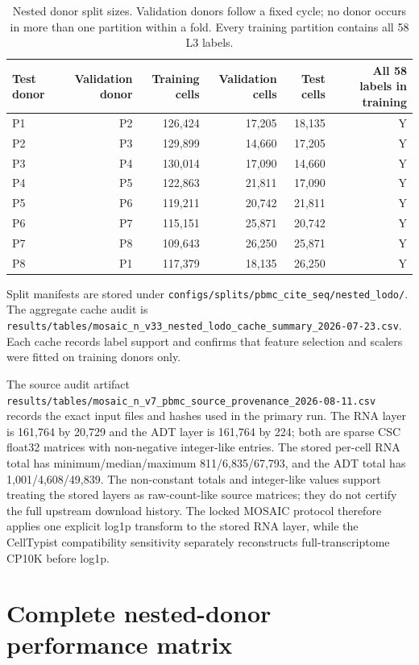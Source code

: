 \documentclass[10pt]{article}
\begin{document}
\begin{table}[H]
\centering
\caption{Nested donor split sizes. Validation donors follow a fixed cycle; no donor occurs in more than one partition within a fold. Every training partition contains all 58 L3 labels.}
\label{tab:splits}
\small
\begin{tabular}{lrrrrr}
\toprule
Test donor & Validation donor & Training cells & Validation cells & Test cells & All 58 labels in training \\
\midrule
P1 & P2 & 126,424 & 17,205 & 18,135 & Y \\
P2 & P3 & 129,899 & 14,660 & 17,205 & Y \\
P3 & P4 & 130,014 & 17,090 & 14,660 & Y \\
P4 & P5 & 122,863 & 21,811 & 17,090 & Y \\
P5 & P6 & 119,211 & 20,742 & 21,811 & Y \\
P6 & P7 & 115,151 & 25,871 & 20,742 & Y \\
P7 & P8 & 109,643 & 26,250 & 25,871 & Y \\
P8 & P1 & 117,379 & 18,135 & 26,250 & Y \\
\bottomrule
\end{tabular}
\end{table}

Split manifests are stored under
\texttt{configs/splits/pbmc\_cite\_seq/nested\_lodo/}. The aggregate cache audit is
\texttt{results/tables/mosaic\_n\_v33\_nested\_lodo\_cache\_summary\_2026-07-23.csv}.
Each cache records label support and confirms that feature selection and scalers were fitted on training donors only.

The source audit artifact \texttt{results/tables/mosaic\_n\_v7\_pbmc\_source\_provenance\_2026-08-11.csv} records the exact input files and hashes used in the primary run. The RNA layer is 161,764 by 20,729 and the ADT layer is 161,764 by 224; both are sparse CSC float32 matrices with non-negative integer-like entries. The stored per-cell RNA total has minimum/median/maximum 811/6,835/67,793, and the ADT total has 1,001/4,608/49,839. The non-constant totals and integer-like values support treating the stored layers as raw-count-like source matrices; they do not certify the full upstream download history. The locked MOSAIC protocol therefore applies one explicit log1p transform to the stored RNA layer, while the CellTypist compatibility sensitivity separately reconstructs full-transcriptome CP10K before log1p.

\section{Complete nested-donor performance matrix}
\end{document}
